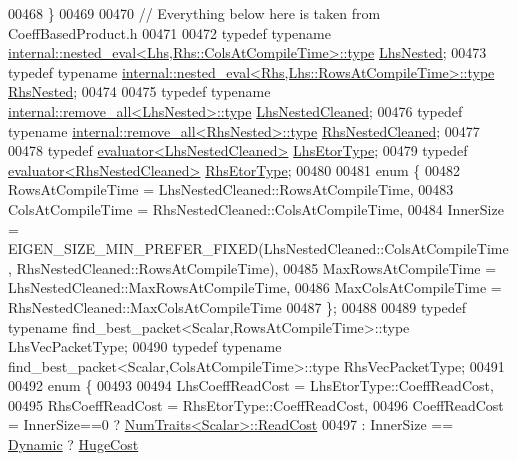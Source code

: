 \begin{DoxyCode}
00468   \}
00469 
00470   \textcolor{comment}{// Everything below here is taken from CoeffBasedProduct.h}
00471 
00472   \textcolor{keyword}{typedef} \textcolor{keyword}{typename} \hyperlink{class_eigen_1_1internal_1_1_tensor_lazy_evaluator_writable}{internal::nested\_eval<Lhs,Rhs::ColsAtCompileTime>::type}
       \hyperlink{class_eigen_1_1internal_1_1_tensor_lazy_evaluator_writable}{LhsNested};
00473   \textcolor{keyword}{typedef} \textcolor{keyword}{typename} \hyperlink{class_eigen_1_1internal_1_1_tensor_lazy_evaluator_writable}{internal::nested\_eval<Rhs,Lhs::RowsAtCompileTime>::type}
       \hyperlink{class_eigen_1_1internal_1_1_tensor_lazy_evaluator_writable}{RhsNested};
00474   
00475   \textcolor{keyword}{typedef} \textcolor{keyword}{typename} \hyperlink{group___sparse_core___module}{internal::remove\_all<LhsNested>::type} 
      \hyperlink{group___sparse_core___module}{LhsNestedCleaned};
00476   \textcolor{keyword}{typedef} \textcolor{keyword}{typename} \hyperlink{group___sparse_core___module}{internal::remove\_all<RhsNested>::type} 
      \hyperlink{group___sparse_core___module}{RhsNestedCleaned};
00477 
00478   \textcolor{keyword}{typedef} \hyperlink{struct_eigen_1_1internal_1_1evaluator}{evaluator<LhsNestedCleaned>} \hyperlink{struct_eigen_1_1internal_1_1evaluator}{LhsEtorType};
00479   \textcolor{keyword}{typedef} \hyperlink{struct_eigen_1_1internal_1_1evaluator}{evaluator<RhsNestedCleaned>} \hyperlink{struct_eigen_1_1internal_1_1evaluator}{RhsEtorType};
00480 
00481   \textcolor{keyword}{enum} \{
00482     RowsAtCompileTime = LhsNestedCleaned::RowsAtCompileTime,
00483     ColsAtCompileTime = RhsNestedCleaned::ColsAtCompileTime,
00484     InnerSize = EIGEN\_SIZE\_MIN\_PREFER\_FIXED(LhsNestedCleaned::ColsAtCompileTime, 
      RhsNestedCleaned::RowsAtCompileTime),
00485     MaxRowsAtCompileTime = LhsNestedCleaned::MaxRowsAtCompileTime,
00486     MaxColsAtCompileTime = RhsNestedCleaned::MaxColsAtCompileTime
00487   \};
00488 
00489   \textcolor{keyword}{typedef} \textcolor{keyword}{typename} find\_best\_packet<Scalar,RowsAtCompileTime>::type LhsVecPacketType;
00490   \textcolor{keyword}{typedef} \textcolor{keyword}{typename} find\_best\_packet<Scalar,ColsAtCompileTime>::type RhsVecPacketType;
00491 
00492   \textcolor{keyword}{enum} \{
00493       
00494     LhsCoeffReadCost = LhsEtorType::CoeffReadCost,
00495     RhsCoeffReadCost = RhsEtorType::CoeffReadCost,
00496     CoeffReadCost = InnerSize==0 ? \hyperlink{group___core___module_struct_eigen_1_1_num_traits}{NumTraits<Scalar>::ReadCost}
00497                   : InnerSize == \hyperlink{namespace_eigen_ad81fa7195215a0ce30017dfac309f0b2}{Dynamic} ? \hyperlink{namespace_eigen_a3163430a1c13173faffde69016b48aaf}{HugeCost}

\end{DoxyCode}
